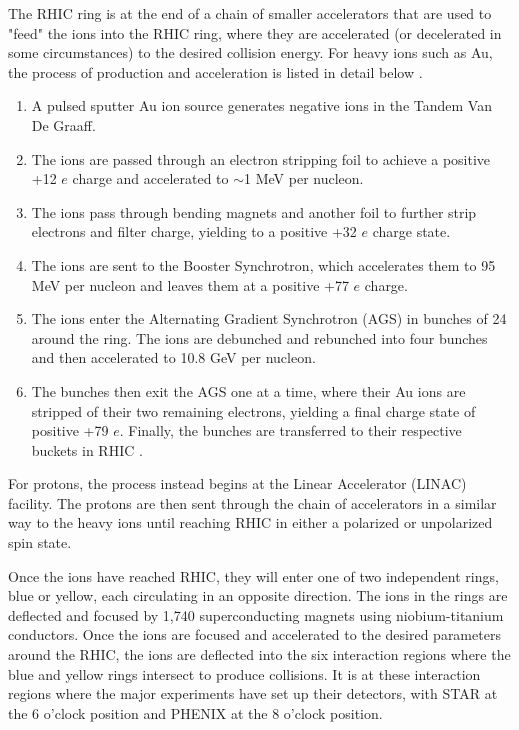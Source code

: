 The RHIC ring is at the end of a chain of smaller accelerators that are used to "feed" the ions into the RHIC ring, where they are accelerated (or decelerated in some circumstances) to the desired collision energy. For heavy ions such as Au, the process of production and acceleration is listed in detail below \cite{ROSER200223}.
\begin{enumerate}
  \item{} A pulsed sputter Au ion source generates negative ions in the Tandem Van De Graaff.
  \item{} The ions are passed through an electron stripping foil to achieve a positive +12 $e$ charge and accelerated to $\sim$1 MeV per nucleon.
  \item{} The ions pass through bending magnets and another foil to further strip electrons and filter charge, yielding to a positive +32 $e$ charge state.
  \item{} The ions are sent to the Booster Synchrotron, which accelerates them to 95 MeV per nucleon and leaves them at a positive +77 $e$ charge.
  \item{} The ions enter the Alternating Gradient Synchrotron (AGS) in bunches of 24 around the ring. The ions are debunched and rebunched into four bunches and then accelerated to 10.8 GeV per nucleon.
  \item{}  The bunches then exit the AGS one at a time, where their Au ions are stripped of their two remaining electrons, yielding a final charge state of positive +79 $e$. Finally, the bunches are transferred to their respective buckets in RHIC . 
\end{enumerate}

For protons, the process instead begins at the Linear Accelerator (LINAC) facility. The protons are then sent through the chain of accelerators in a similar way to the heavy ions until reaching RHIC in either a polarized or unpolarized spin state. 

Once the ions have reached RHIC, they will enter one of two independent rings, blue or yellow, each circulating in an opposite direction. The ions in the rings are deflected and focused by 1,740 superconducting magnets using niobium-titanium conductors. Once the ions are focused and accelerated to the desired parameters around the RHIC, the ions are deflected into the six interaction regions where the blue and yellow rings intersect to produce collisions. It is at these interaction regions where the major experiments have set up their detectors, with STAR at the 6 o'clock position and PHENIX at the 8 o'clock position.

